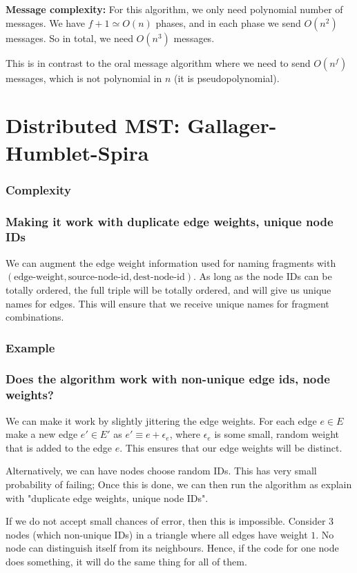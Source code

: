 \documentclass{article}
\begin{document}
\textbf{Message complexity:}
For this algorithm, we only need polynomial number of messages. We have
$f+1 \simeq O(n)$ phases, and in each phase we send $O(n^2)$ messages. So in total, 
we need $O(n^3)$ messages. 

This is in contrast to the oral message algorithm where we need to
send $O(n^f)$ messages, which is not polynomial in $n$ (it is pseudopolynomial).




\section{Distributed MST: Gallager-Humblet-Spira}
\subsubsection{Complexity}


\subsubsection{Making it work with duplicate edge weights, unique node IDs}
We can augment the edge weight information used for naming fragments
with $(\text{edge-weight}, \text{source-node-id}, \text{dest-node-id})$. As
long as the node IDs can be totally ordered, the full triple will be
totally ordered, and will give us unique names for edges. This will ensure
that we receive unique names for fragment combinations.

\subsubsection{Example}

\subsubsection{Does the algorithm work with non-unique edge ids, node weights?}
We can make it work by slightly jittering the edge weights. For each edge $e \in E$
make a new edge $e' \in E'$ as $e' \equiv e + \epsilon_e$, where $\epsilon_e$ 
is some small, random weight that is added to the edge $e$. This ensures that
our edge weights will be distinct. 

Alternatively, we can have nodes choose random IDs. This has very small probability
of failing; Once this is done, we can then run the algorithm as explain with
"duplicate edge weights, unique node IDs".

If we do not accept small chances of error, then this is impossible.
Consider 3 nodes (which non-unique IDs) in a triangle where all edges have
weight $1$.  No node can distinguish itself from its
neighbours. Hence, if the code for one node does something, it will do the
same thing for all of them.
\end{document}
